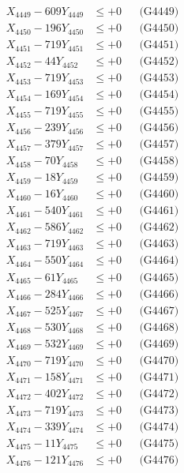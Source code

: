 \documentclass[a4paper,10pt]{article}
\begin{document}
{\begin{align}
X_{4449} - 609Y_{4449} &\leq +0 && \text{(G4449)} \\
X_{4450} - 196Y_{4450} &\leq +0 && \text{(G4450)} \\
\allowbreak
X_{4451} - 719Y_{4451} &\leq +0 && \text{(G4451)} \\
X_{4452} - 44Y_{4452} &\leq +0 && \text{(G4452)} \\
X_{4453} - 719Y_{4453} &\leq +0 && \text{(G4453)} \\
X_{4454} - 169Y_{4454} &\leq +0 && \text{(G4454)} \\
X_{4455} - 719Y_{4455} &\leq +0 && \text{(G4455)} \\
X_{4456} - 239Y_{4456} &\leq +0 && \text{(G4456)} \\
X_{4457} - 379Y_{4457} &\leq +0 && \text{(G4457)} \\
X_{4458} - 70Y_{4458} &\leq +0 && \text{(G4458)} \\
X_{4459} - 18Y_{4459} &\leq +0 && \text{(G4459)} \\
X_{4460} - 16Y_{4460} &\leq +0 && \text{(G4460)} \\
\allowbreak
X_{4461} - 540Y_{4461} &\leq +0 && \text{(G4461)} \\
X_{4462} - 586Y_{4462} &\leq +0 && \text{(G4462)} \\
X_{4463} - 719Y_{4463} &\leq +0 && \text{(G4463)} \\
X_{4464} - 550Y_{4464} &\leq +0 && \text{(G4464)} \\
X_{4465} - 61Y_{4465} &\leq +0 && \text{(G4465)} \\
X_{4466} - 284Y_{4466} &\leq +0 && \text{(G4466)} \\
X_{4467} - 525Y_{4467} &\leq +0 && \text{(G4467)} \\
X_{4468} - 530Y_{4468} &\leq +0 && \text{(G4468)} \\
X_{4469} - 532Y_{4469} &\leq +0 && \text{(G4469)} \\
X_{4470} - 719Y_{4470} &\leq +0 && \text{(G4470)} \\
\allowbreak
X_{4471} - 158Y_{4471} &\leq +0 && \text{(G4471)} \\
X_{4472} - 402Y_{4472} &\leq +0 && \text{(G4472)} \\
X_{4473} - 719Y_{4473} &\leq +0 && \text{(G4473)} \\
X_{4474} - 339Y_{4474} &\leq +0 && \text{(G4474)} \\
X_{4475} - 11Y_{4475} &\leq +0 && \text{(G4475)} \\
X_{4476} - 121Y_{4476} &\leq +0 && \text{(G4476)} \\

\end{align}}
\end{document}
